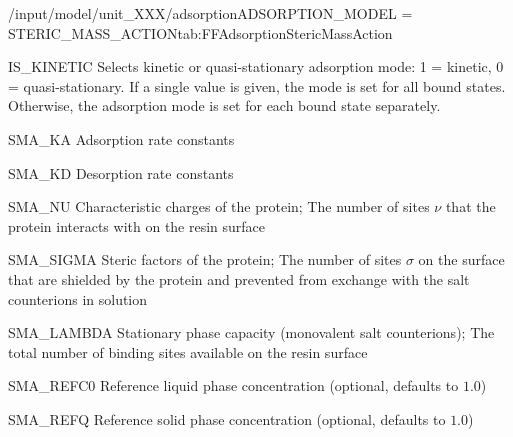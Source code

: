 \begin{condsubgroup}{/input/model/unit\_XXX/adsorption}{ADSORPTION\_MODEL = STERIC\_MASS\_ACTION}{tab:FFAdsorptionStericMassAction}
  \begin{dataset}[type=int,range={$\{ 0,1 \}$},length={1 / \texttt{NTOTALBND}}]{IS\_KINETIC}
    Selects kinetic or quasi-stationary adsorption mode: 1 = kinetic, 0 = quasi-stationary.
    If a single value is given, the mode is set for all bound states.
    Otherwise, the adsorption mode is set for each bound state separately.
  \end{dataset}
  \begin{dataset}[unit=\si{\raiseto{3}\metre\of{MP}\per\raiseto{3}\metre\of{SP}\per\second}, type=double,range={$\geq 0$},length={\texttt{NCOMP}}]{SMA\_KA}
    Adsorption rate constants
  \end{dataset}
  \begin{dataset}[unit=\si{\per\second}, type=double,range={$\geq 0$},length={\texttt{NCOMP}}]{SMA\_KD}
    Desorption rate constants
  \end{dataset}
  \begin{dataset}[type=double,range={$\geq 0$},length={\texttt{NCOMP}}]{SMA\_NU}
    Characteristic charges of the protein; The number of sites $\nu$ that the protein interacts with on the resin surface
  \end{dataset}
  \begin{dataset}[type=double,range={$\geq 0$},length={\texttt{NCOMP}}]{SMA\_SIGMA}
    Steric factors of the protein; The number of sites $\sigma$ on the surface that are shielded by the protein and prevented from exchange with the salt counterions in solution
  \end{dataset}
  \begin{dataset}[unit=\si{\mol\per\cubic\metre\of{SP}}, type=double,range={$\geq 0$},length={1}]{SMA\_LAMBDA}
    Stationary phase capacity (monovalent salt counterions); The total number of binding sites available on the resin surface 
  \end{dataset}
  \begin{dataset}[unit=\si{\mol\per\raiseto{3}\metre\of{MP}}, type=double,range={$> 0$},length={1}]{SMA\_REFC0}
    Reference liquid phase concentration (optional, defaults to $1.0$)
  \end{dataset}
  \begin{dataset}[unit=\si{\mol\per\raiseto{3}\metre\of{SP}}, type=double,range={$> 0$},length={1}]{SMA\_REFQ}
    Reference solid phase concentration (optional, defaults to $1.0$) 
  \end{dataset}
\end{condsubgroup}


